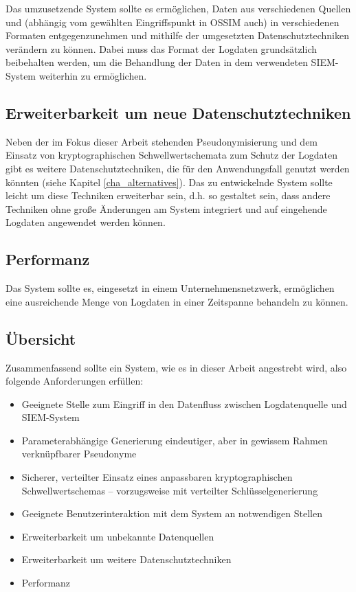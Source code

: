 Das umzusetzende System sollte es ermöglichen, Daten aus verschiedenen Quellen und (abhängig vom gewählten Eingriffspunkt in OSSIM auch) in verschiedenen Formaten entgegenzunehmen und mithilfe der umgesetzten Datenschutztechniken verändern zu können. Dabei muss das Format der Logdaten grundsätzlich beibehalten werden, um die Behandlung der Daten in dem verwendeten SIEM-System weiterhin zu ermöglichen.

\subsection{Erweiterbarkeit um neue Datenschutztechniken}

\label{subsec_impl_requirements_plugins}

Neben der im Fokus dieser Arbeit stehenden Pseudonymisierung und dem Einsatz von kryptographischen Schwellwertschemata zum Schutz der Logdaten gibt es weitere Datenschutztechniken, die für den Anwendungsfall genutzt werden könnten (siehe Kapitel \ref{cha_alternatives}). Das zu entwickelnde System sollte leicht um diese Techniken erweiterbar sein, d.h. so gestaltet sein, dass andere Techniken ohne große Änderungen am System integriert und auf eingehende Logdaten angewendet werden können.

\subsection{Performanz}

Das System sollte es, eingesetzt in einem Unternehmensnetzwerk, ermöglichen eine ausreichende Menge von Logdaten in einer Zeitspanne behandeln zu können. 

\subsection{Übersicht}

Zusammenfassend sollte ein System, wie es in dieser Arbeit angestrebt wird, also folgende Anforderungen erfüllen:

\begin{itemize}
  \item Geeignete Stelle zum Eingriff in den Datenfluss zwischen Logdatenquelle und SIEM-System
  \item Parameterabhängige Generierung eindeutiger, aber in gewissem Rahmen verknüpfbarer Pseudonyme
  \item Sicherer, verteilter Einsatz eines anpassbaren kryptographischen Schwellwertschemas -- vorzugsweise mit verteilter Schlüsselgenerierung
  \item Geeignete Benutzerinteraktion mit dem System an notwendigen Stellen
  \item Erweiterbarkeit um unbekannte Datenquellen
  \item Erweiterbarkeit um weitere Datenschutztechniken
  \item Performanz
\end{itemize}
